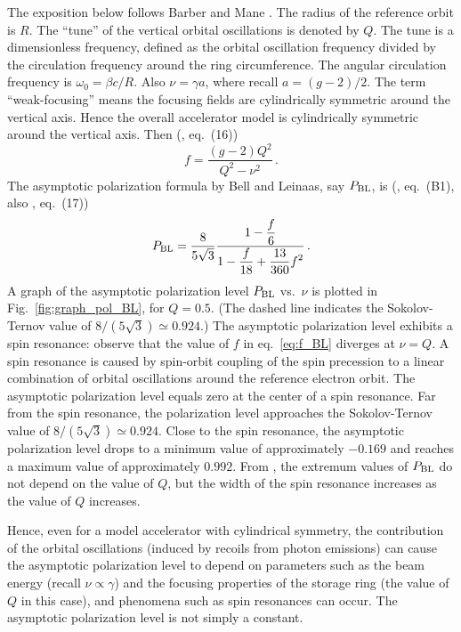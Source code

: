 \documentclass[review]{elsarticle}
\theoremstyle{plain}
\begin{document}
The exposition below follows Barber and Mane \cite{BM}.
The radius of the reference orbit is $R$.
The ``tune'' of the vertical orbital oscillations is denoted by $Q$.
The tune is a dimensionless frequency, defined as the orbital oscillation frequency divided by the circulation frequency around the ring circumference.
The angular circulation frequency is $\omega_0 = \beta c/R$.
Also $\nu = \gamma a$, where recall $a=(g-2)/2$.
The term ``weak-focusing'' means the focusing fields are cylindrically symmetric around the vertical axis.
Hence the overall accelerator model is cylindrically symmetric around the vertical axis.
Then (\cite{BM}, eq.~(16))
\begin{equation}  
\label{eq:f_BL}
  f = \frac{(g-2)Q^2}{Q^2-\nu^2} \,.
\end{equation}  
The asymptotic polarization formula by Bell and Leinaas, say $P_{\rm BL}$, is (\cite{BL1987}, eq.~(B1), also \cite{BM}, eq.~(17))
\begin{equation}
\label{eq:P_BL}
  P_{\rm BL} = \frac{8}{5\sqrt3}\frac{\displaystyle 1 -\frac{f}{6}}{\displaystyle 1 -\frac{f}{18} +\frac{13}{360}f^2} \,.
\end{equation}  
A graph of the asymptotic polarization level $P_{\rm BL}$ vs.~$\nu$ is plotted in Fig.~\ref{fig:graph_pol_BL}, for $Q=0.5$.
(The dashed line indicates the Sokolov-Ternov value of $8/(5\sqrt3)\simeq 0.924$.)
The asymptotic polarization level exhibits a spin resonance: observe that the value of $f$ in eq.~\eqref{eq:f_BL} diverges at $\nu=Q$.
A spin resonance is caused by spin-orbit coupling of the spin precession
to a linear combination of orbital oscillations around the reference electron orbit.
The asymptotic polarization level equals zero at the center of a spin resonance.
Far from the spin resonance, the polarization level approaches the Sokolov-Ternov value of $8/(5\sqrt3)\simeq 0.924$.
Close to the spin resonance, the asymptotic polarization level drops to a minimum value of approximately $-0.169$ and reaches a maximum value of approximately $0.992$.
From \cite{BM}, the extremum values of $P_{\rm BL}$ do not depend on the value of $Q$, but the width of the spin resonance increases as the value of $Q$ increases.

Hence, even for a model accelerator with cylindrical symmetry,
the contribution of the orbital oscillations (induced by recoils from photon emissions)
can cause the asymptotic polarization level to depend on parameters such as the beam energy (recall $\nu \propto \gamma$)
and the focusing properties of the storage ring (the value of $Q$ in this case),
and phenomena such as spin resonances can occur.
The asymptotic polarization level is not simply a constant.
\end{document}
